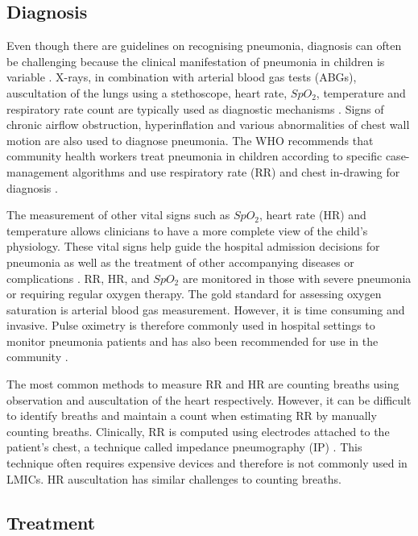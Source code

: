 \subsection{Diagnosis}

Even though there are guidelines on recognising pneumonia, diagnosis can often be challenging because the clinical manifestation of pneumonia in children is variable \cite{shah2017does}. X-rays, in combination with arterial blood gas tests (ABGs), auscultation of the lungs using a stethoscope, heart rate, $SpO_{2}$, temperature and respiratory rate count are typically used as diagnostic mechanisms \cite{cherian2005standardized}. Signs of chronic airflow obstruction, hyperinflation and various abnormalities of chest wall motion are also used to diagnose pneumonia. The WHO recommends that community health workers treat pneumonia in children according to specific case-management algorithms and use respiratory rate (RR) and chest in-drawing for diagnosis \cite{world2011integrated}.  

The measurement of other vital signs such as $SpO_{2}$, heart rate (HR) and temperature allows clinicians to have a more complete view of the child's physiology. These vital signs help guide the hospital admission decisions for pneumonia as well as the treatment of other accompanying diseases or complications \cite{majumdar2011oxygen}. RR, HR, and $SpO_{2}$ are monitored in those with severe pneumonia or requiring regular oxygen therapy. The gold standard for assessing oxygen saturation is arterial blood gas measurement. However, it is time consuming and invasive. Pulse oximetry is therefore commonly used in hospital settings to monitor pneumonia patients and has also been recommended for use in the community \cite{gupta2010oxygen}. 

The most common methods to measure RR and HR are counting breaths using observation and auscultation of the heart respectively. However, it can be difficult to identify breaths and maintain a count when estimating RR by manually counting breaths. Clinically, RR is computed using electrodes attached to the patient's chest, a technique called impedance pneumography (IP) \cite{bailon2006robust}. This technique often requires expensive devices and therefore is not commonly used in LMICs. HR auscultation has similar challenges to counting breaths.

\subsection{Treatment}

